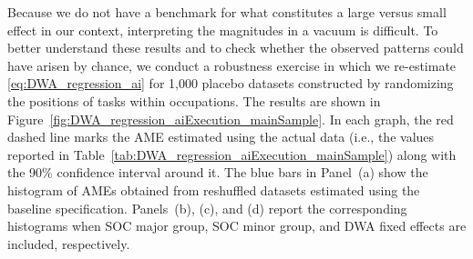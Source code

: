 Because we do not have a benchmark for what constitutes a large versus small effect in our context, interpreting the magnitudes in a vacuum is difficult.
To better understand these results and to check whether the observed patterns could have arisen by chance, we conduct a robustness exercise in which we re-estimate \eqref{eq:DWA_regression_ai} for 1,000 placebo datasets constructed by randomizing the positions of tasks within occupations.
The results are shown in Figure~\ref{fig:DWA_regression_aiExecution_mainSample}.
In each graph, the red dashed line marks the AME estimated using the actual data (i.e., the values reported in Table~\ref{tab:DWA_regression_aiExecution_mainSample}) along with the 90\% confidence interval around it.
The blue bars in Panel~(a) show the histogram of AMEs obtained from reshuffled datasets estimated using the baseline specification.
Panels~(b), (c), and (d) report the corresponding histograms when SOC major group, SOC minor group, and DWA fixed effects are included, respectively.


